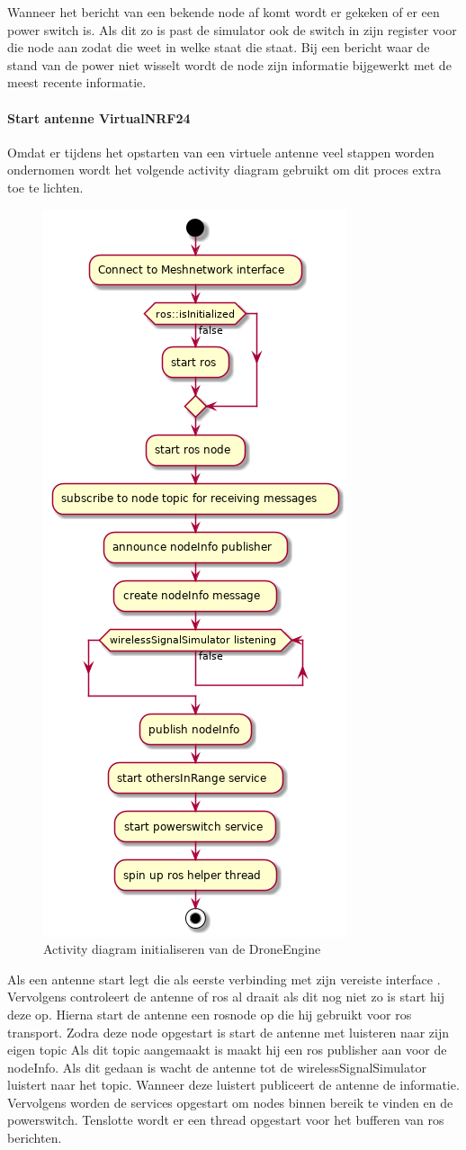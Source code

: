 \documentclass[a4paper, 11pt, oneside]{report}
\begin{document}
Wanneer het bericht van een bekende node af komt wordt er gekeken of er een power switch is.
Als dit zo is past de simulator ook de switch in zijn register voor die node aan zodat die weet in welke staat die staat.
Bij een bericht waar de stand van de power niet wisselt wordt de node zijn informatie bijgewerkt met de meest recente informatie.

\paragraph{Start antenne VirtualNRF24}
\label{DetailedDesign:ros:Activity:antenne}

Omdat er tijdens het opstarten van een virtuele antenne veel stappen worden ondernomen wordt het volgende activity diagram gebruikt om dit proces extra toe te lichten.

\begin{figure}[H]
	\begin{center}\includegraphics[width=.4\linewidth]{UML/out/ros/activity/StartAntenna/StartAntenna.png}\end{center}
	\caption{Activity diagram initialiseren van de DroneEngine}
	\label{fig:ros:MeshNetwerk:Activity:antenne}
\end{figure}

Als een antenne start legt die als eerste verbinding met zijn vereiste interface . 
Vervolgens controleert de antenne of ros al draait als dit nog niet zo is start hij deze op.
Hierna start de antenne een rosnode op die hij gebruikt voor ros transport.
Zodra deze node opgestart is start de antenne met luisteren naar zijn eigen topic
Als dit topic aangemaakt is maakt hij een ros publisher aan voor de nodeInfo.  
Als dit gedaan is wacht de antenne tot de wirelessSignalSimulator luistert naar het topic.
Wanneer deze luistert publiceert de antenne de informatie.
Vervolgens worden de services opgestart om nodes binnen bereik te vinden en de powerswitch.
Tenslotte wordt er een thread opgestart voor het bufferen van ros berichten.
\end{document}
